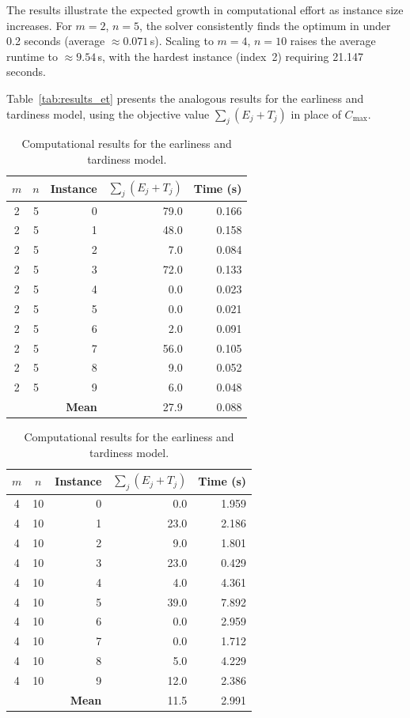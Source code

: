 \documentclass{article}
\begin{document}
The results illustrate the expected growth in computational effort as instance size increases. For $m=2$, $n=5$, the solver consistently finds the optimum in under 0.2 seconds (average $\approx 0.071$\,s). Scaling to $m=4$, $n=10$ raises the average runtime to $\approx 9.54$\,s, with the hardest instance (index~2) requiring 21.147 seconds.

Table~\ref{tab:results_et} presents the analogous results for the earliness and tardiness model, using the objective value $\sum_j(E_j + T_j)$ in place of $C_{\max}$.

\begin{table}[ht]
\centering
\caption{Computational results for the earliness and tardiness model.}
\label{tab:results_et}
\renewcommand{\arraystretch}{1.3}
\begin{minipage}{0.48\linewidth}
\centering
{}
\label{tab:results_et_small}
\begin{tabular}{ccrrr}
\toprule
$m$ & $n$ & Instance & $\sum_j(E_j + T_j)$ & Time (s) \\
\midrule
2 & 5 & 0 & 79.0 & 0.166 \\
2 & 5 & 1 & 48.0 & 0.158 \\
2 & 5 & 2 &  7.0 & 0.084 \\
2 & 5 & 3 & 72.0 & 0.133 \\
2 & 5 & 4 &  0.0 & 0.023 \\
2 & 5 & 5 &  0.0 & 0.021 \\
2 & 5 & 6 &  2.0 & 0.091 \\
2 & 5 & 7 & 56.0 & 0.105 \\
2 & 5 & 8 &  9.0 & 0.052 \\
2 & 5 & 9 &  6.0 & 0.048 \\ \hline
& &\textbf{Mean} & 27.9 & 0.088 \\
\bottomrule
\end{tabular}
\end{minipage}
\hfill
\begin{minipage}{0.48\linewidth}
\centering
{}
\label{tab:results_et_medium}
\begin{tabular}{ccrrr}
\toprule
$m$ & $n$ & Instance & $\sum_j(E_j + T_j)$ & Time (s) \\
\midrule
4 & 10 & 0 &  0.0 & 1.959 \\
4 & 10 & 1 & 23.0 & 2.186 \\
4 & 10 & 2 &  9.0 & 1.801 \\
4 & 10 & 3 & 23.0 & 0.429 \\
4 & 10 & 4 &  4.0 & 4.361 \\
4 & 10 & 5 & 39.0 & 7.892 \\
4 & 10 & 6 &  0.0 & 2.959 \\
4 & 10 & 7 &  0.0 & 1.712 \\
4 & 10 & 8 &  5.0 & 4.229 \\
4 & 10 & 9 & 12.0 & 2.386 \\ \hline
& &\textbf{Mean} & 11.5 & 2.991 \\
\bottomrule
\end{tabular}
\end{minipage}
\end{table}
\end{document}
